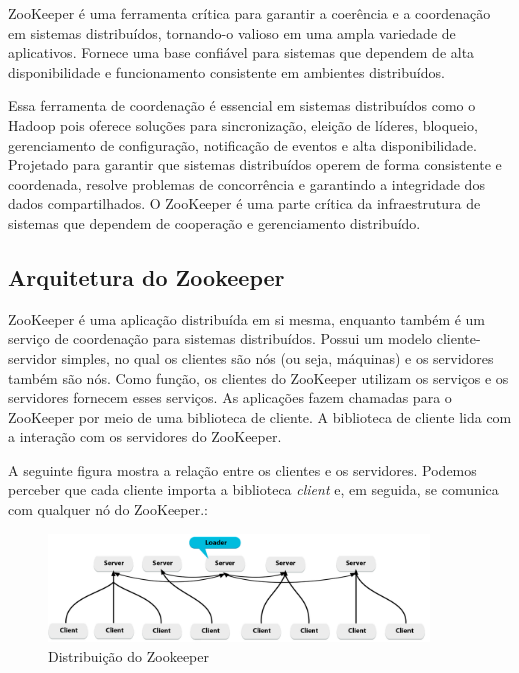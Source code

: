 \documentclass[a4paper,11pt]{article}
\begin{document}
ZooKeeper é uma ferramenta crítica para garantir a coerência e a coordenação em sistemas distribuídos, tornando-o valioso em uma ampla variedade de aplicativos. Fornece uma base confiável para sistemas que dependem de alta disponibilidade e funcionamento consistente em ambientes distribuídos.

Essa ferramenta de coordenação é essencial em sistemas distribuídos como o Hadoop pois oferece soluções para sincronização, eleição de líderes, bloqueio, gerenciamento de configuração, notificação de eventos e alta disponibilidade. Projetado para garantir que sistemas distribuídos operem de forma consistente e coordenada, resolve problemas de concorrência e garantindo a integridade dos dados compartilhados. O ZooKeeper é uma parte crítica da infraestrutura de sistemas que dependem de cooperação e gerenciamento distribuído.

\subsection{Arquitetura do Zookeeper}
ZooKeeper é uma aplicação distribuída em si mesma, enquanto também é um serviço de coordenação para sistemas distribuídos. Possui um modelo cliente-servidor simples, no qual os clientes são nós (ou seja, máquinas) e os servidores também são nós. Como função, os clientes do ZooKeeper utilizam os serviços e os servidores fornecem esses serviços. As aplicações fazem chamadas para o ZooKeeper por meio de uma biblioteca de cliente. A biblioteca de cliente lida com a interação com os servidores do ZooKeeper.

A seguinte figura mostra a relação entre os clientes e os servidores. Podemos perceber que cada cliente importa a biblioteca \textit{client} e, em seguida, se comunica com qualquer nó do ZooKeeper.:
\begin{figure}[H]
	\centering
	\includegraphics[width=0.9\textwidth]{imagem/arquitetura}
	\caption{Distribuição do Zookeeper}
\end{figure}
\end{document}
